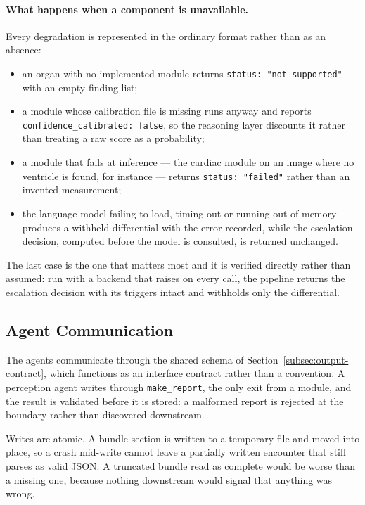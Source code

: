 \paragraph{What happens when a component is unavailable.} Every degradation is represented in
the ordinary format rather than as an absence:

\begin{itemize}
  \item an organ with no implemented module returns \texttt{status: "not\_supported"} with an
        empty finding list;
  \item a module whose calibration file is missing runs anyway and reports
        \texttt{confidence\_calibrated: false}, so the reasoning layer discounts it rather than
        treating a raw score as a probability;
  \item a module that fails at inference --- the cardiac module on an image where no ventricle
        is found, for instance --- returns \texttt{status: "failed"} rather than an invented
        measurement;
  \item the language model failing to load, timing out or running out of memory produces a
        withheld differential with the error recorded, while the escalation decision, computed
        before the model is consulted, is returned unchanged.
\end{itemize}

The last case is the one that matters most and it is verified directly rather than assumed: run
with a backend that raises on every call, the pipeline returns the escalation decision with its
triggers intact and withholds only the differential.

\subsection{Agent Communication}
\label{subsec:integration-comm}

The agents communicate through the shared schema of Section~\ref{subsec:output-contract}, which
functions as an interface contract rather than a convention. A perception agent writes through
\texttt{make\_report}, the only exit from a module, and the result is validated before it is
stored: a malformed report is rejected at the boundary rather than discovered downstream.

Writes are atomic. A bundle section is written to a temporary file and moved into place, so a
crash mid-write cannot leave a partially written encounter that still parses as valid JSON. A
truncated bundle read as complete would be worse than a missing one, because nothing downstream
would signal that anything was wrong.

